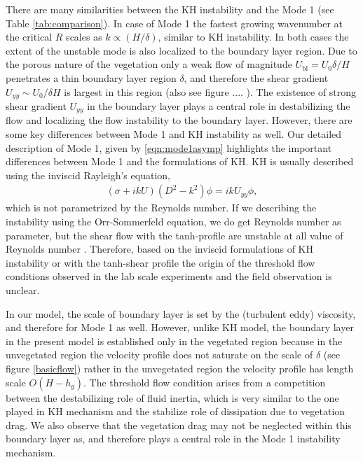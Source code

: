 \documentclass[12pt]{report}   %
\newcommand{\Rey}{{R}}
\newcommand{\ubl}{U_\text{bl}}
\begin{document}
There are many similarities between the KH instability and the Mode 1 (see Table \ref{tab:comparison}). 
In case of Mode 1 the fastest growing wavenumber at the critical $\Rey$ scales as $k \propto (H/\delta)$, similar to KH instability. 
In both cases the extent of the unstable mode is also localized to the boundary layer region.
Due to the porous nature of the vegetation only a weak flow of magnitude $\ubl = U_0 \delta/H$ penetrates a thin boundary layer region $\delta$, and therefore the shear gradient $U_{yy} \sim U_0/\delta H$ is largest in this region (also see figure .... ).
The existence of strong shear gradient $U_{yy}$ in the boundary layer plays a central role in destabilizing the flow and localizing the flow instability to the boundary layer. However, there are some key differences between Mode 1 and KH instability as well. 
Our detailed description of Mode 1, given by \eqref{eqn:mode1asymp} highlights the important differences between Mode 1 and the formulations of KH. 
KH is usually described using the inviscid Rayleigh's equation, 
\begin{align}
\left(\sigma+ikU\right) \left(D^2-k^2\right)\phi =  ikU_{yy}\phi, 
\label{eqn:Rayleigh}
\end{align}
which is not parametrized by the Reynolds number. If we describing the instability using the Orr-Sommerfeld equation, we do get Reynolds number as parameter, but the shear flow with the tanh-profile are unstable at all value of Reynolds number \cite{Drazin81}. Therefore, based on the inviscid formulations of KH instability or with the tanh-shear profile the origin of the threshold flow conditions observed in the lab scale experiments and the field observation is unclear.

In our model, the scale of boundary layer is set by the (turbulent eddy) viscosity, and therefore for Mode 1 as well.
However, unlike KH model, the boundary layer in the present model is established only in the vegetated region because in the unvegetated region the velocity profile does not saturate on the scale of $\delta$ (see figure \ref{basicflow}) rather in the unvegetated region the velocity profile has length scale $O(H-h_g)$. The threshold flow condition arises from a competition between the destabilizing role of fluid inertia, which is very similar to the one played in KH mechanism and the stabilize role of dissipation due to vegetation drag. We also observe that the vegetation drag may not be neglected within this boundary layer as, and therefore plays a central role in the Mode 1 instability mechanism.
\end{document}
